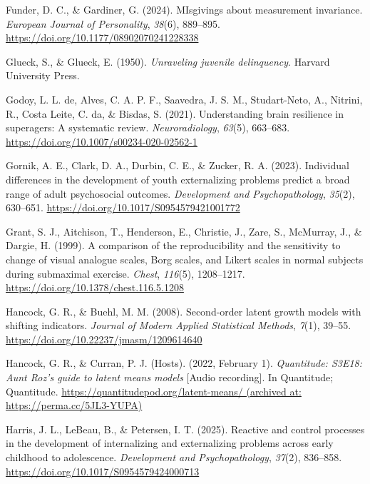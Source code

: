 \documentclass[
  american,
  letterpaper,
  12pt]{article}
\newlength{\cslhangindent}
\newenvironment{CSLReferences}[2] %
 {\begin{list}{}{%
  \setlength{\itemindent}{0pt}
  \setlength{\leftmargin}{0pt}
  \setlength{\parsep}{0pt}
  \ifodd #1
   \setlength{\leftmargin}{\cslhangindent}
   \setlength{\itemindent}{-1\cslhangindent}
  \fi
  \setlength{\itemsep}{#2\baselineskip}}}
 {\end{list}}
\begin{document}
\begin{CSLReferences}{1}{0}
Funder, D. C., \& Gardiner, G. (2024). {MIsgivings} about measurement
invariance. \emph{European Journal of Personality}, \emph{38}(6),
889--895. \url{https://doi.org/10.1177/08902070241228338}

Glueck, S., \& Glueck, E. (1950). \emph{Unraveling juvenile
delinquency}. Harvard University Press.

Godoy, L. L. de, Alves, C. A. P. F., Saavedra, J. S. M., Studart-Neto,
A., Nitrini, R., Costa Leite, C. da, \& Bisdas, S. (2021). Understanding
brain resilience in superagers: {A} systematic review.
\emph{Neuroradiology}, \emph{63}(5), 663--683.
\url{https://doi.org/10.1007/s00234-020-02562-1}

Gornik, A. E., Clark, D. A., Durbin, C. E., \& Zucker, R. A. (2023).
Individual differences in the development of youth externalizing
problems predict a broad range of adult psychosocial outcomes.
\emph{Development and Psychopathology}, \emph{35}(2), 630--651.
\url{https://doi.org/10.1017/S0954579421001772}

Grant, S. J., Aitchison, T., Henderson, E., Christie, J., Zare, S.,
McMurray, J., \& Dargie, H. (1999). A comparison of the reproducibility
and the sensitivity to change of visual analogue scales, {Borg} scales,
and {Likert} scales in normal subjects during submaximal exercise.
\emph{Chest}, \emph{116}(5), 1208--1217.
\url{https://doi.org/10.1378/chest.116.5.1208}

Hancock, G. R., \& Buehl, M. M. (2008). Second-order latent growth
models with shifting indicators. \emph{Journal of Modern Applied
Statistical Methods}, \emph{7}(1), 39--55.
\url{https://doi.org/10.22237/jmasm/1209614640}

Hancock, G. R., \& Curran, P. J. (Hosts). (2022, February 1).
\emph{Quantitude: S3E18: {Aunt Roz's} guide to latent means models}
{[}Audio recording{]}. In Quantitude; Quantitude.
\href{https://quantitudepod.org/latent-means/\%20(archived\%20at:\%20https://perma.cc/5JL3-YUPA)}{https://quantitudepod.org/latent-means/
(archived at: https://perma.cc/5JL3-YUPA)}

Harris, J. L., LeBeau, B., \& Petersen, I. T. (2025). Reactive and
control processes in the development of internalizing and externalizing
problems across early childhood to adolescence. \emph{Development and
Psychopathology}, \emph{37}(2), 836--858.
\url{https://doi.org/10.1017/S0954579424000713}


\end{CSLReferences}
\end{document}
